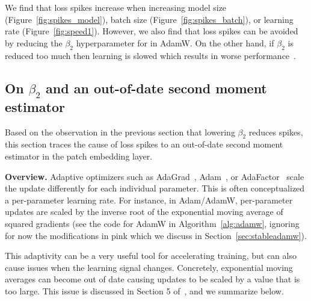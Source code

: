 We find that loss spikes increase when increasing model size (Figure~\ref{fig:spikes_model}), batch size (Figure~\ref{fig:spikes_batch}), or learning rate (Figure~\ref{fig:speed1}).
However, we also find that loss spikes can be avoided by reducing the $\beta_2$ hyperparameter for in AdamW. On the other hand, if $\beta_2$ is reduced too much then learning is slowed which results in worse performance~\cite{reddi2019convergence}.

\subsection{On $\beta_2$ and an out-of-date second moment estimator}\label{sec:measure}

Based on the observation in the previous section that lowering $\beta_2$ reduces spikes, this section traces the cause of loss spikes to an out-of-date second moment estimator in the patch embedding layer.

\textbf{Overview.} Adaptive optimizers such as AdaGrad~\cite{duchi2011adaptive}, Adam~\cite{kingma2014adam}, or AdaFactor~\cite{shazeer2018adafactor} scale the update differently for each individual parameter. This is often conceptualized a per-parameter learning rate. For instance, in Adam/AdamW, per-parameter updates are scaled by the inverse root of the exponential moving average of squared gradients (see the code for AdamW in Algorithm~\ref{alg:adamw}, ignoring for now the modifications in pink which we discuss in Section~\ref{sec:stableadamw}).

This adaptivity can be a very useful tool for accelerating training, but can also cause issues when the learning signal changes. Concretely, exponential moving averages can become out of date causing updates to be scaled by a value that is too large. This issue is discussed in Section 5 of~\citet{shazeer2018adafactor}, and we summarize below.

